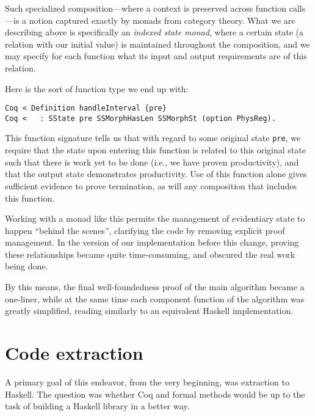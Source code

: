 \documentclass{llncs}
\begin{document}
Such specialized composition---where a context is preserved across function
calls---is a notion captured exactly by monads from category theory.  What we
are describing above is specifically an \emph{indexed state monad}, where a
certain state (a relation with our initial value) is maintained throughout the
composition, and we may specify for each function what its input and output
requirements are of this relation.

Here is the sort of function type we end up with:

\begin{flushleft}
\texttt{Coq~{<}~Definition~handleInterval~\{pre\}}\\
\texttt{Coq~{<}~~~:~SState~pre~SSMorphHasLen~SSMorphSt~(option~PhysReg).}\\
\end{flushleft}

This function signature tells us that with regard to some original state
\texttt{pre}, we require that the state upon entering this function is related
to this original state such that there is work yet to be done (i.e., we have
proven productivity), and that the output state demonstrates productivity.
Use of this function alone gives sufficient evidence to prove termination, as
will any composition that includes this function.

Working with a monad like this permits the management of evidentiary state to
happen ``behind the scenes'', clarifying the code by removing explicit proof
management.  In the version of our implementation before this change, proving
these relationships became quite time-consuming, and obscured the real work
being done.

By this means, the final well-foundedness proof of the main algorithm became a
one-liner, while at the same time each component function of the algorithm was
greatly simplified, reading similarly to an equivalent Haskell implementation.


\section{Code extraction}
\label{sec:extract}

A primary goal of this endeavor, from the very beginning, was extraction to
Haskell.  The question was whether Coq and formal methods would be up to the
task of building a Haskell library in a better way.
\end{document}
